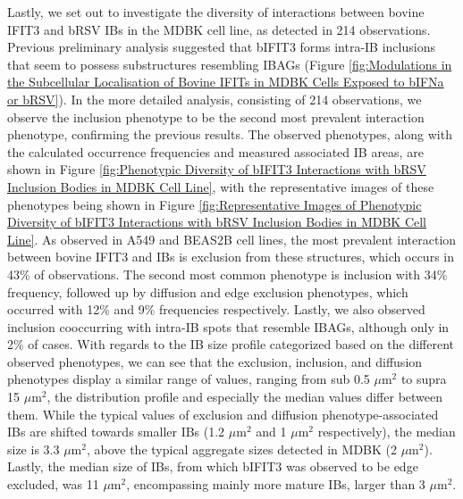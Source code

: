 Lastly, we set out to investigate the diversity of interactions between bovine IFIT3 and bRSV IBs in the MDBK cell line, as detected in 214 observations. Previous preliminary analysis suggested that bIFIT3 forms intra-IB inclusions that seem to possess substructures resembling IBAGs (Figure \ref{fig:Modulations in the Subcellular Localisation of Bovine IFITs in MDBK Cells Exposed to bIFNa or bRSV}). In the more detailed analysis, consisting of 214 observations, we observe the inclusion phenotype to be the second most prevalent interaction phenotype, confirming the previous results. The observed phenotypes, along with the calculated occurrence frequencies and measured associated IB areas, are shown in Figure \ref{fig:Phenotypic Diversity of bIFIT3 Interactions with bRSV Inclusion Bodies in MDBK Cell Line}, with the representative images of these phenotypes being shown in Figure \ref{fig:Representative Images of Phenotypic Diversity of bIFIT3 Interactions with bRSV Inclusion Bodies in MDBK Cell Line}. As observed in A549 and BEAS2B cell lines, the most prevalent interaction between bovine IFIT3 and IBs is exclusion from these structures, which occurs in 43\% of observations. The second most common phenotype is inclusion with 34\% frequency, followed up by diffusion and edge exclusion phenotypes, which occurred with 12\% and 9\% frequencies respectively. Lastly, we also observed inclusion cooccurring with intra-IB spots that resemble IBAGs, although only in 2\% of cases. With regards to the IB size profile categorized based on the different observed phenotypes, we can see that the exclusion, inclusion, and diffusion phenotypes display a similar range of values, ranging from sub 0.5 \(\mu \mbox{m}^2\) to supra 15 \(\mu \mbox{m}^2\), the distribution profile and especially the median values differ between them. While the typical values of exclusion and diffusion phenotype-associated IBs are shifted towards smaller IBs (1.2 \(\mu \mbox{m}^2\) and 1 \(\mu \mbox{m}^2\) respectively), the median size is 3.3 \(\mu \mbox{m}^2\), above the typical aggregate sizes detected in MDBK (2 \(\mu \mbox{m}^2\)). Lastly, the median size of IBs, from which bIFIT3 was observed to be edge excluded, was 11 \(\mu \mbox{m}^2\), encompassing mainly more mature IBs, larger than 3 \(\mu \mbox{m}^2\).

